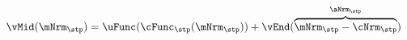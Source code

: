   \begin{equation}\begin{gathered}\begin{aligned}
\vMid(\mNrm_{\stp}) & = \uFunc(\cFunc_{\stp}(\mNrm_{\stp})) + \vEnd(\overbrace{\mNrm_{\stp}-\cNrm_{\stp}}^{\aNrm_{\stp}}) \label{eq:vMid}
      \end{aligned}\end{gathered}\end{equation}
